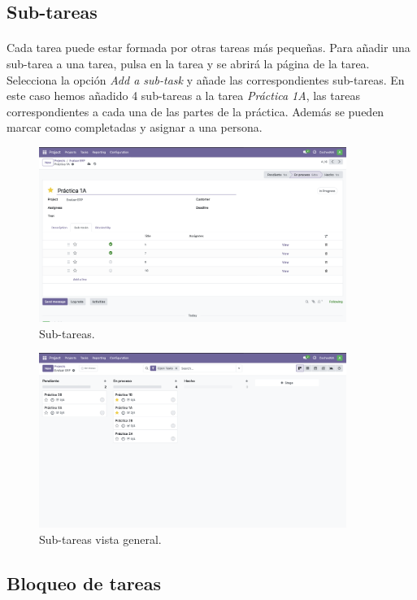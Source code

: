 \documentclass[paper=a4wide, fontsize=11pt]{report}	 %
\begin{document}
\subsection{Sub-tareas}
\paragraph{}
Cada tarea puede estar formada por otras tareas más pequeñas. Para añadir una sub-tarea a una tarea, pulsa en la tarea y se abrirá la página de la tarea. Selecciona la opción \textit{Add a sub-task} y añade las correspondientes sub-tareas. En este caso hemos añadido 4 sub-tareas a la tarea \textit{Práctica 1A}, las tareas correspondientes a cada una de las partes de la práctica. Además se pueden marcar como completadas y asignar a una persona.
\begin{figure}[h]
    \centering
    \includegraphics[width=10cm]{subItemsProject.png}
    \caption{Sub-tareas.}
    \label{fig:openProyectos}
\end{figure}
\begin{figure}[h]
    \centering
    \includegraphics[width=10cm]{completedSubtaskProject.png}
    \caption{Sub-tareas vista general.}
    \label{fig:openProyectos}
\end{figure}
\subsection{Bloqueo de tareas}
\end{document}
